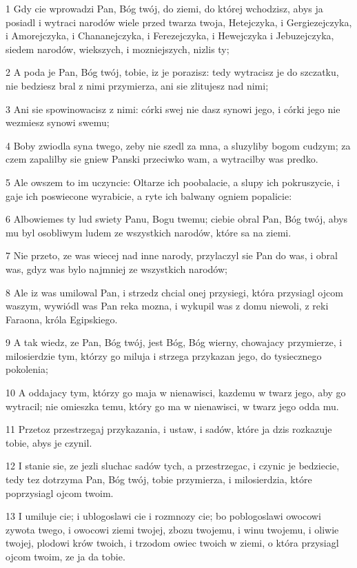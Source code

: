 \par 1 Gdy cie wprowadzi Pan, Bóg twój, do ziemi, do której wchodzisz, abys ja posiadl i wytraci narodów wiele przed twarza twoja, Hetejczyka, i Gergiezejczyka, i Amorejczyka, i Chananejczyka, i Ferezejczyka, i Hewejczyka i Jebuzejczyka, siedem narodów, wiekszych, i mozniejszych, nizlis ty;
\par 2 A poda je Pan, Bóg twój, tobie, iz je porazisz: tedy wytracisz je do szczatku, nie bedziesz bral z nimi przymierza, ani sie zlitujesz nad nimi;
\par 3 Ani sie spowinowacisz z nimi: córki swej nie dasz synowi jego, i córki jego nie wezmiesz synowi swemu;
\par 4 Boby zwiodla syna twego, zeby nie szedl za mna, a sluzyliby bogom cudzym; za czem zapalilby sie gniew Panski przeciwko wam, a wytracilby was predko.
\par 5 Ale owszem to im uczyncie: Oltarze ich poobalacie, a slupy ich pokruszycie, i gaje ich poswiecone wyrabicie, a ryte ich balwany ogniem popalicie:
\par 6 Albowiemes ty lud swiety Panu, Bogu twemu; ciebie obral Pan, Bóg twój, abys mu byl osobliwym ludem ze wszystkich narodów, które sa na ziemi.
\par 7 Nie przeto, ze was wiecej nad inne narody, przylaczyl sie Pan do was, i obral was, gdyz was bylo najmniej ze wszystkich narodów;
\par 8 Ale iz was umilowal Pan, i strzedz chcial onej przysiegi, która przysiagl ojcom waszym, wywiódl was Pan reka mozna, i wykupil was z domu niewoli, z reki Faraona, króla Egipskiego.
\par 9 A tak wiedz, ze Pan, Bóg twój, jest Bóg, Bóg wierny, chowajacy przymierze, i milosierdzie tym, którzy go miluja i strzega przykazan jego, do tysiecznego pokolenia;
\par 10 A oddajacy tym, którzy go maja w nienawisci, kazdemu w twarz jego, aby go wytracil; nie omieszka temu, który go ma w nienawisci, w twarz jego odda mu.
\par 11 Przetoz przestrzegaj przykazania, i ustaw, i sadów, które ja dzis rozkazuje tobie, abys je czynil.
\par 12 I stanie sie, ze jezli sluchac sadów tych, a przestrzegac, i czynic je bedziecie, tedy tez dotrzyma Pan, Bóg twój, tobie przymierza, i milosierdzia, które poprzysiagl ojcom twoim.
\par 13 I umiluje cie; i ublogoslawi cie i rozmnozy cie; bo poblogoslawi owocowi zywota twego, i owocowi ziemi twojej, zbozu twojemu, i winu twojemu, i oliwie twojej, plodowi krów twoich, i trzodom owiec twoich w ziemi, o która przysiagl ojcom twoim, ze ja da tobie.
